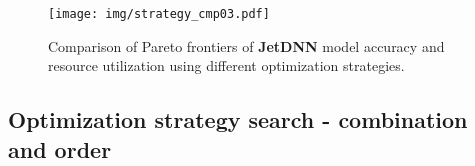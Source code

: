 \begin{figure}
\begin{center}
\texttt{[image: img/strategy\_cmp03.pdf]}
\end{center}
   \caption{Comparison of Pareto frontiers of \textbf{JetDNN} model accuracy and resource utilization using different optimization strategies.}
\label{fig:strategy_cmp}

\end{figure}


\subsection{Optimization strategy search - combination and order}\label{sec:opt_search}


